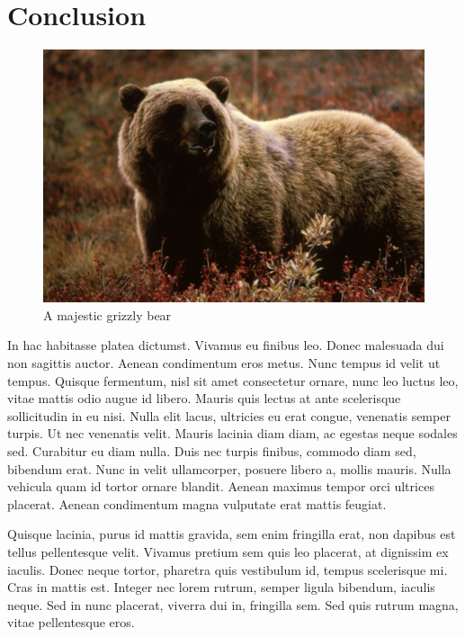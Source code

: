 \documentclass[10pt, a4paper, twocolumn]{article} %
\begin{document}
\section{Conclusion}

\begin{figure}
	\includegraphics[width=\linewidth]{bear.jpg} %
	\caption{A majestic grizzly bear} %
	\label{bear} %
\end{figure}

In hac habitasse platea dictumst. Vivamus eu finibus leo. Donec malesuada dui non sagittis auctor. Aenean condimentum eros metus. Nunc tempus id velit ut tempus. Quisque fermentum, nisl sit amet consectetur ornare, nunc leo luctus leo, vitae mattis odio augue id libero. Mauris quis lectus at ante scelerisque sollicitudin in eu nisi. Nulla elit lacus, ultricies eu erat congue, venenatis semper turpis. Ut nec venenatis velit. Mauris lacinia diam diam, ac egestas neque sodales sed. Curabitur eu diam nulla. Duis nec turpis finibus, commodo diam sed, bibendum erat. Nunc in velit ullamcorper, posuere libero a, mollis mauris. Nulla vehicula quam id tortor ornare blandit. Aenean maximus tempor orci ultrices placerat. Aenean condimentum magna vulputate erat mattis feugiat.

Quisque lacinia, purus id mattis gravida, sem enim fringilla erat, non dapibus est tellus pellentesque velit. Vivamus pretium sem quis leo placerat, at dignissim ex iaculis. Donec neque tortor, pharetra quis vestibulum id, tempus scelerisque mi. Cras in mattis est. Integer nec lorem rutrum, semper ligula bibendum, iaculis neque. Sed in nunc placerat, viverra dui in, fringilla sem. Sed quis rutrum magna, vitae pellentesque eros.
\end{document}
